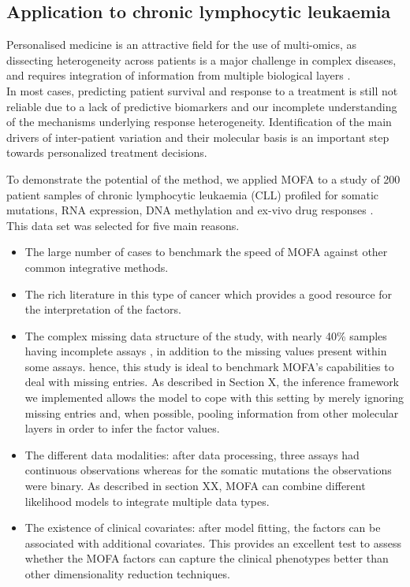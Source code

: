 \subsection{Application to chronic lymphocytic leukaemia} \label{section:mofa_cll}
Personalised medicine is an attractive field for the use of multi-omics, as dissecting heterogeneity across patients is a major challenge in complex diseases, and requires integration of information from multiple biological layers \cite{Chen2013,Costello2014,Alyass2015}.\\
In most cases, predicting patient survival and response to a treatment is still not reliable due to a lack of predictive biomarkers and our incomplete understanding of the mechanisms underlying response heterogeneity. Identification of the main drivers of inter-patient variation and their molecular basis is an important step towards personalized treatment decisions. 

To demonstrate the potential of the method, we applied MOFA to a study of 200 patient samples of chronic lymphocytic leukaemia (CLL) profiled for somatic mutations, RNA expression, DNA methylation and ex-vivo drug responses\cite{Dietrich2018} .\\

This data set was selected for five main reasons. 
\begin{itemize}
	\item The large number of cases to benchmark the speed of MOFA against other common integrative methods.
	\item The rich literature in this type of cancer which provides a good resource for the interpretation of the factors.
	\item The complex missing data structure of the study, with nearly 40\% samples having incomplete assays , in addition to the missing values present within some assays. hence, this study is ideal to benchmark MOFA's capabilities to deal with missing entries. As described in Section X, the inference framework we implemented allows the model to cope with this setting by merely ignoring missing entries and, when possible, pooling information from other molecular layers in order to infer the factor values.
	\item The different data modalities: after data processing, three assays had continuous observations whereas for the somatic mutations the observations were binary. As described in section XX, MOFA can combine different likelihood models to integrate multiple data types.
	\item The existence of clinical covariates: after model fitting, the factors can be associated with additional covariates. This provides an excellent test to assess whether the MOFA factors can capture the clinical phenotypes better than other dimensionality reduction techniques.
\end{itemize}


